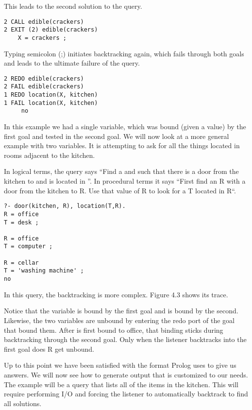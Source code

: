 This leads to the second solution to the query.

\begin{verbatim}
2 CALL edible(crackers)
2 EXIT (2) edible(crackers)
    X = crackers ;
\end{verbatim}

Typing semicolon (;) initiates backtracking again, which fails through both
goals and leads to the ultimate failure of the query.

\begin{verbatim}
2 REDO edible(crackers)
2 FAIL edible(crackers)
1 REDO location(X, kitchen)
1 FAIL location(X, kitchen)
     no
\end{verbatim}

\secup

In this example we had a single variable, which was bound (given a value) by the
first goal and tested in the second goal. We will now look at a more general
example with two variables. It is attempting to ask for all the things located
in rooms adjacent to the kitchen.

In logical terms, the query says ``Find a  and  such that there is
a door from the kitchen to  and  is located in ''. In
procedural terms it says ``First find an R with a door from the kitchen to R.
Use that value of R to look for a T located in R``.
\begin{verbatim}
?- door(kitchen, R), location(T,R).
R = office
T = desk ;

R = office
T = computer ;

R = cellar
T = 'washing machine' ;
no
\end{verbatim}

In this query, the backtracking is more complex. Figure 4.3 shows its trace.


Notice that the variable  is bound by the first goal and  is bound
by the second. Likewise, the two variables are unbound by entering the redo port
of the goal that bound them. After  is first bound to office, that
binding sticks during backtracking through the second goal. Only when the
listener backtracks into the first goal does R get unbound.


Up to this point we have been satisfied with the format Prolog uses to give us
answers. We will now see how to generate output that is customized to our needs.
The example will be a query that lists all of the items in the kitchen. This
will require performing I/O and forcing the listener to automatically backtrack
to find all solutions.

